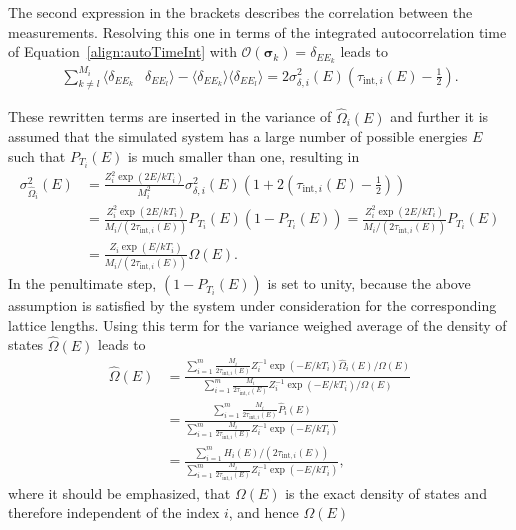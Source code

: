 The second expression in the brackets describes the correlation between the measurements. Resolving this one in terms of the integrated 
autocorrelation time of Equation~\eqref{align:autoTimeInt} with $\mathcal{O}(\bm{\sigma}_k)=\delta_{EE_k}$ leads to
\begin{align*}
    \sum_{k\neq l}^{M_i}\langle\delta_{EE_k}&\delta_{EE_l}\rangle\!-\!\langle\delta_{EE_k}\rangle\langle\delta_{EE_l}\rangle
    =2\sigma^2_{\delta,i}(E)\left(\tau_{\mathrm{int},i}(E)-\frac{1}{2}\right).
\end{align*}

These rewritten terms are inserted in the variance of $\hat{\Omega}_i(E)$ and further it is assumed that the simulated system has a large number of 
possible energies $E$ such that $P_{T_i}(E)$ is much smaller than one, resulting in
\begin{align*}
    \sigma^2_{\hat{\Omega}_i}(E) &= \frac{Z_i^2\exp(2E/kT_i)}{M^2_i}\sigma^2_{\delta,i}(E)\left(1\!+\!2\left(\tau_{\mathrm{int},i}(E)\!-\!\frac{1}{2}\right)\right) \\
     &= \frac{Z_i^2\exp(2E/kT_i)}{M_i/(2\tau_{\mathrm{int},i}(E))}P_{T_i}(E)(1\!-\!P_{T_i}(E)) 
      = \frac{Z_i^2\exp(2E/kT_i)}{M_i/(2\tau_{\mathrm{int},i}(E))}P_{T_i}(E) \\
     &= \frac{Z_i\exp(E/kT_i)}{M_i/(2\tau_{\mathrm{int},i}(E))}\Omega(E).
\end{align*}
In the penultimate step, $(1\!-\!P_{T_i}(E))$ is set to unity, because the above assumption is satisfied by the system under consideration for 
the corresponding lattice lengths. Using this term for the variance weighed average of the density of states $\hat{\Omega}(E)$ leads to
\begin{align*}
    \hat{\Omega}(E) &= \frac{\sum_{i=1}^m\frac{M_i}{2\tau_{\mathrm{int},i}(E)}Z_i^{-1}\exp(-E/kT_i)\hat{\Omega}_i(E)/\Omega(E)}
                            {\sum_{i=1}^m\frac{M_i}{2\tau_{\mathrm{int},i}(E)}Z_i^{-1}\exp(-E/kT_i)/\Omega(E)} \\ 
                    &= \frac{\sum_{i=1}^m\frac{M_i}{2\tau_{\mathrm{int},i}(E)}\hat{P}_i(E)}
                            {\sum_{i=1}^m\frac{M_i}{2\tau_{\mathrm{int},i}(E)}Z_i^{-1}\exp(-E/kT_i)} \\
                    &= \frac{\sum_{i=1}^mH_i(E)/(2\tau_{\mathrm{int},i}(E))}
                            {\sum_{i=1}^m\frac{M_i}{2\tau_{\mathrm{int},i}(E)}Z_i^{-1}\exp(-E/kT_i)}, 
\end{align*}
where it should be emphasized, that $\Omega(E)$ is the exact density of states and therefore independent of the index $i$, and hence $\Omega(E)$ 
